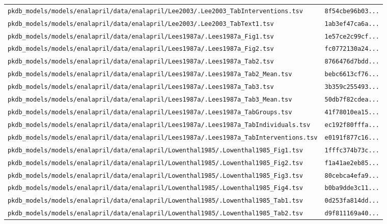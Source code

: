 \documentclass{article}
\begin{document}
\begin{longtable}{ll}
\texttt{pkdb\_models/models/enalapril/data/enalapril/Lee2003/.Lee2003\_TabInterventions.tsv} & \texttt{8f54cbe96b03...} \\
\texttt{pkdb\_models/models/enalapril/data/enalapril/Lee2003/.Lee2003\_TabText1.tsv} & \texttt{1ab3ef47ca6a...} \\
\texttt{pkdb\_models/models/enalapril/data/enalapril/Lees1987a/.Lees1987a\_Fig1.tsv} & \texttt{1e57ce2c99cf...} \\
\texttt{pkdb\_models/models/enalapril/data/enalapril/Lees1987a/.Lees1987a\_Fig2.tsv} & \texttt{fc0772130a24...} \\
\texttt{pkdb\_models/models/enalapril/data/enalapril/Lees1987a/.Lees1987a\_Tab2.tsv} & \texttt{8766476d7bdd...} \\
\texttt{pkdb\_models/models/enalapril/data/enalapril/Lees1987a/.Lees1987a\_Tab2\_Mean.tsv} & \texttt{bebc6613cf76...} \\
\texttt{pkdb\_models/models/enalapril/data/enalapril/Lees1987a/.Lees1987a\_Tab3.tsv} & \texttt{3b359c255493...} \\
\texttt{pkdb\_models/models/enalapril/data/enalapril/Lees1987a/.Lees1987a\_Tab3\_Mean.tsv} & \texttt{50db7f82cdea...} \\
\texttt{pkdb\_models/models/enalapril/data/enalapril/Lees1987a/.Lees1987a\_TabGroups.tsv} & \texttt{41f78010ea15...} \\
\texttt{pkdb\_models/models/enalapril/data/enalapril/Lees1987a/.Lees1987a\_TabIndividuals.tsv} & \texttt{ec192f80fffa...} \\
\texttt{pkdb\_models/models/enalapril/data/enalapril/Lees1987a/.Lees1987a\_TabInterventions.tsv} & \texttt{e0191f877c16...} \\
\texttt{pkdb\_models/models/enalapril/data/enalapril/Lowenthal1985/.Lowenthal1985\_Fig1.tsv} & \texttt{1fffc374b73c...} \\
\texttt{pkdb\_models/models/enalapril/data/enalapril/Lowenthal1985/.Lowenthal1985\_Fig2.tsv} & \texttt{f1a41ae2eb85...} \\
\texttt{pkdb\_models/models/enalapril/data/enalapril/Lowenthal1985/.Lowenthal1985\_Fig3.tsv} & \texttt{80cebca4efa9...} \\
\texttt{pkdb\_models/models/enalapril/data/enalapril/Lowenthal1985/.Lowenthal1985\_Fig4.tsv} & \texttt{b0ba9dde3c11...} \\
\texttt{pkdb\_models/models/enalapril/data/enalapril/Lowenthal1985/.Lowenthal1985\_Tab1.tsv} & \texttt{0d253fa814dd...} \\
\texttt{pkdb\_models/models/enalapril/data/enalapril/Lowenthal1985/.Lowenthal1985\_Tab2.tsv} & \texttt{d9f811169a40...} \\

\end{longtable}
\end{document}
